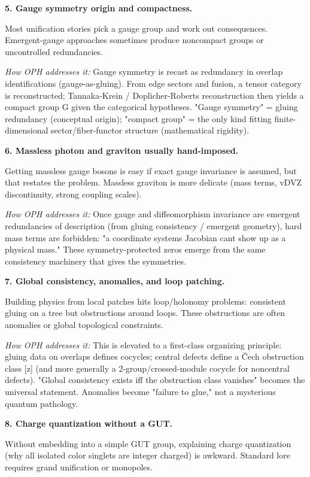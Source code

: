 \textbf{5. Gauge symmetry origin and compactness.}

Most unification stories pick a gauge group and work out consequences. Emergent-gauge approaches sometimes produce noncompact groups or uncontrolled redundancies.

\emph{How OPH addresses it:} Gauge symmetry is recast as redundancy in overlap identifications (gauge-as-gluing). From edge sectors and fusion, a tensor category is reconstructed; Tannaka-Krein / Doplicher-Roberts reconstruction then yields a compact group G given the categorical hypotheses. "Gauge symmetry" = gluing redundancy (conceptual origin); "compact group" = the only kind fitting finite-dimensional sector/fiber-functor structure (mathematical rigidity).

\textbf{6. Massless photon and graviton usually hand-imposed.}

Getting massless gauge bosons is easy if exact gauge invariance is assumed, but that restates the problem. Massless graviton is more delicate (mass terms, vDVZ discontinuity, strong coupling scales).

\emph{How OPH addresses it:} Once gauge and diffeomorphism invariance are emergent redundancies of description (from gluing consistency / emergent geometry), hard mass terms are forbidden: "a coordinate system\textquotesingle s Jacobian can\textquotesingle t show up as a physical mass." These symmetry-protected zeros emerge from the same consistency machinery that gives the symmetries.

\textbf{7. Global consistency, anomalies, and loop patching.}

Building physics from local patches hits loop/holonomy problems: consistent gluing on a tree but obstructions around loops. These obstructions are often anomalies or global topological constraints.

\emph{How OPH addresses it:} This is elevated to a first-class organizing principle: gluing data on overlaps defines cocycles; central defects define a \v{C}ech obstruction class {[}z{]} (and more generally a 2-group/crossed-module cocycle for noncentral defects). "Global consistency exists iff the obstruction class vanishes" becomes the universal statement. Anomalies become "failure to glue," not a mysterious quantum pathology.

\textbf{8. Charge quantization without a GUT.}

Without embedding into a simple GUT group, explaining charge quantization (why all isolated color singlets are integer charged) is awkward. Standard lore requires grand unification or monopoles.

